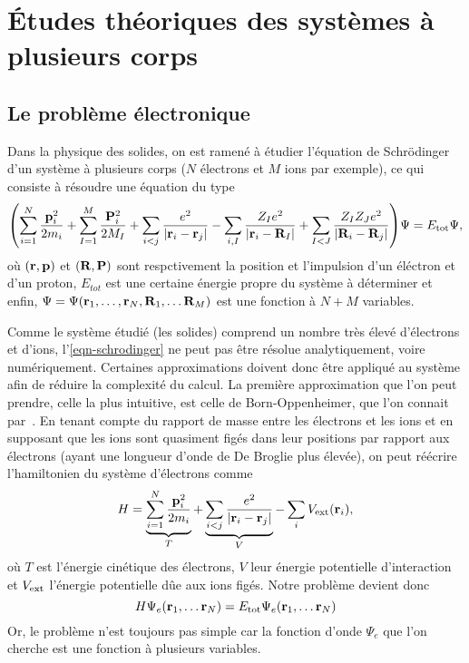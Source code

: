 \chapter{Études théoriques des systèmes à plusieurs corps}
\label{chap-theory}
\section{Le problème électronique}
Dans la physique des solides, on est ramené à étudier l'équation de Schrödinger d'un système
à plusieurs corps ($N$ électrons et $M$ ions par exemple),
ce qui consiste à résoudre une équation du type
\begin{equation}
  \label{eqn-schrodinger}
  \qty(\sum_{i=1}^N \frac{\vb{p}_i^2}{2m_i}
  + \sum_{I=1}^M \frac{\vb{P}_i^2}{2M_I}
  + \sum_{i<j}\frac{e^2}{\abs{\vb{r}_i - \vb{r}_j}}
  - \sum_{i,I}\frac{Z_I e^2}{\abs{\vb{r}_i - \vb{R}_I}}
  + \sum_{I<J}\frac{Z_I Z_J e^2}{\abs{\vb{R}_i - \vb{R}_j}} )\Psi = E_{\textnormal{tot}}\Psi,
\end{equation}
où $(\vb{r}, \vb{p})$ et $(\vb{R}, \vb{P})$ sont respctivement la position et l'impulsion d'un éléctron et d'un proton,
$E_{tot}$ est une certaine énergie propre du système à déterminer et enfin,
$\Psi = \Psi(\vb{r}_1, \ldots, \vb{r}_N,  \vb{R}_1, \ldots \vb{R}_M)$ est une fonction à $N+M$ variables.

Comme le système étudié (les solides) comprend un nombre très élevé d'électrons et d'ions,
l'\cref{eqn-schrodinger} ne peut pas être résolue analytiquement, voire numériquement.
Certaines approximations doivent donc être appliqué au système afin de réduire la complexité du calcul.
La première approximation que l'on peut prendre, celle la plus intuitive,
est celle de Born-Oppenheimer, que l'on connait par~\cite{Born1927}.
En tenant compte du rapport de masse entre les électrons et les ions
et en supposant que les ions sont quasiment figés dans leur positions par rapport aux électrons
(ayant une longueur d'onde de De Broglie plus élevée),
on peut réécrire l'hamiltonien du système d'électrons comme
\begin{equation*}
  H = \underbrace{\sum_{i=1}^N\frac{\vb{p}_i^2}{2m_i}}_{T}
    + \underbrace{\sum_{i<j}\frac{e^2}{\abs{\vb{r}_i - \vb{r}_j}}}_{V}
    - \sum_i V_{\textnormal{ext}}(\vb{r}_i),
\end{equation*}
où $T$ est l'énergie cinétique des électrons, $V$ leur énergie potentielle d'interaction
et $V_{\textnormal{ext}}$ l'énergie potentielle dûe aux ions figés.
Notre problème devient donc
\begin{equation*}
  H\Psi_e(\vb{r}_1, \ldots \vb{r}_N) = E_{\textnormal{tot}} \Psi_e(\vb{r}_1, \ldots \vb{r}_N)
\end{equation*}
Or, le problème n'est toujours pas simple car la fonction d'onde $\Psi_e$
que l'on cherche est une fonction à plusieurs variables.

